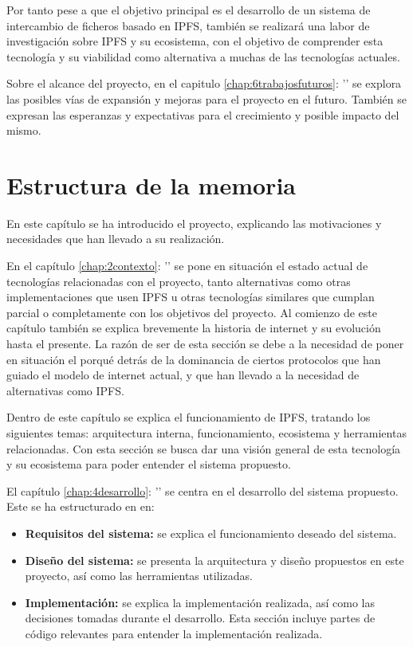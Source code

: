 Por tanto pese a que el objetivo principal es el desarrollo de un sistema de intercambio de ficheros basado en IPFS,
también se realizará una labor de investigación sobre  IPFS y su ecosistema, con el objetivo de comprender esta
tecnología y su viabilidad como alternativa a muchas de las tecnologías actuales.

Sobre el alcance del proyecto, en el capitulo \ref{chap:6trabajosfuturos}: '' se explora las posibles vías de expansión y mejoras para el proyecto en el futuro. También se expresan las esperanzas y expectativas para el crecimiento y posible impacto del mismo.

\section{Estructura de la memoria}
En este capítulo se ha introducido el proyecto, explicando las motivaciones y necesidades que han llevado a su realización.

En el capítulo \ref{chap:2contexto}: '' se pone en situación el estado actual de tecnologías relacionadas con el proyecto, tanto alternativas
como otras implementaciones que usen IPFS u otras tecnologías similares que cumplan parcial o completamente con los objetivos del proyecto.
Al comienzo de este capítulo también se explica brevemente la historia de internet y su evolución hasta el presente.
La razón de ser de esta sección se debe a la necesidad de poner en situación el porqué detrás de la dominancia de ciertos
protocolos que han guiado el modelo de internet actual, y que han llevado a la necesidad de alternativas como IPFS.

Dentro de este capítulo se explica el funcionamiento de IPFS, tratando los siguientes temas: arquitectura interna, funcionamiento,
ecosistema y herramientas relacionadas. Con esta sección se busca dar una visión general de esta tecnología y su ecosistema para
poder entender el sistema propuesto.

El capítulo \ref{chap:4desarrollo}: '' se centra en el desarrollo del sistema propuesto. Este se ha estructurado en en:
\begin{itemize}
      \item \textbf{Requisitos del sistema:} se explica el funcionamiento deseado del sistema.
      \item \textbf{Diseño del sistema:} se presenta la arquitectura y diseño propuestos en este proyecto, así como las herramientas utilizadas.
      \item \textbf{Implementación:} se explica la implementación realizada, así como las decisiones tomadas durante el desarrollo. Esta sección
            incluye partes de código relevantes para entender la implementación realizada.
\end{itemize}

